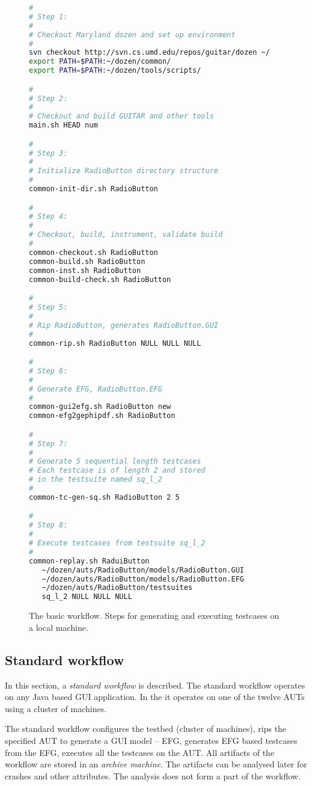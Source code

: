 \begin{figure}
\scriptsize{
\begin{lstlisting}[language=sh]
#
# Step 1:
#
# Checkout Maryland dozen and set up environment
#
svn checkout http://svn.cs.umd.edu/repos/guitar/dozen ~/
export PATH=$PATH:~/dozen/common/
export PATH=$PATH:~/dozen/tools/scripts/

#
# Step 2:
#
# Checkout and build GUITAR and other tools
main.sh HEAD num

#
# Step 3:
#
# Initialize RadioButton directory structure
#
common-init-dir.sh RadioButton

#
# Step 4:
#
# Checkout, build, instrument, validate build
#
common-checkout.sh RadioButton
common-build.sh RadioButton
common-inst.sh RadioButton
common-build-check.sh RadioButton

#
# Step 5:
#
# Rip RadioButton, generates RadioButton.GUI
#
common-rip.sh RadioButton NULL NULL NULL

#
# Step 6:
#
# Generate EFG, RadioButton.EFG
#
common-gui2efg.sh RadioButton new
common-efg2gephipdf.sh RadioButton

#
# Step 7:
#
# Generate 5 sequential length testcases
# Each testcase is of length 2 and stored
# in the testsuite named sq_l_2 
#
common-tc-gen-sq.sh RadioButton 2 5

#
# Step 8:
#
# Execute testcases from testsuite sq_l_2
#
common-replay.sh RaduiButton
   ~/dozen/auts/RadioButton/models/RadioButton.GUI
   ~/dozen/auts/RadioButton/models/RadioButton.EFG
   ~/dozen/auts/RadioButton/testsuites
   sq_l_2 NULL NULL NULL

\end{lstlisting}
}

\caption{The basic workflow. Steps for generating and executing testcases on a local machine.}
\label{fig:basicworkflow}
\end{figure}



\subsection{Standard workflow}
\label{sec:standardworkflow}

In this section, a \textit{standard workflow} is described. The standard workflow operates on any Java based GUI application. In the \mddozen{} it operates on one of the twelve AUTs using a cluster of machines.

The standard workflow configures the testbed (cluster of machines), rips the specified AUT to generate a GUI model -- EFG, generates EFG based testcases from the EFG, executes all the testcases on the AUT. All artifacts of the workflow are stored in an \textit{archive machine}. The artifacts can be analysed later for crashes and other attributes. The analysis does not form a part of the \mddozen{} workflow.

